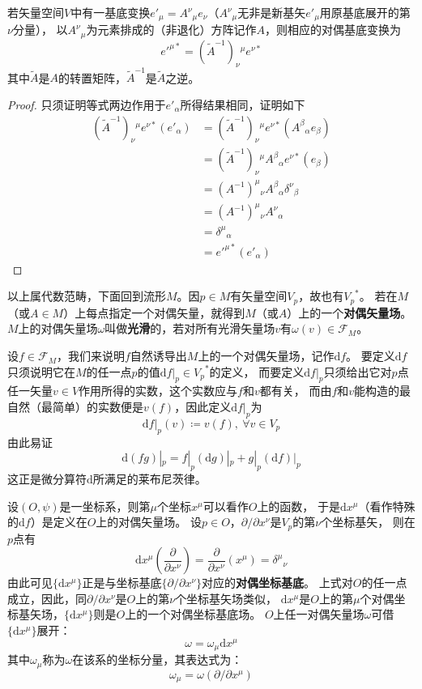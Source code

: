 \begin{theorem}
若矢量空间$V$中有一基底变换$e'_\mu = A^\nu{}_\mu e_\nu$（$A^\nu{}_\mu$无非是新基矢$e'_\mu$用原基底展开的第$\nu$分量），
以$A^\nu{}_\mu$为元素排成的（非退化）方阵记作$A$，则相应的对偶基底变换为
$$e'^{\mu*} = (\tilde{A}^{-1})_\nu{}^\mu e^{\nu*}$$
其中$\tilde{A}$是$A$的转置矩阵，$\tilde{A}^{-1}$是$\tilde{A}$之逆。
\end{theorem}

\begin{proof}
只须证明等式两边作用于$e'_\alpha$所得结果相同，证明如下
$$\begin{aligned}
(\tilde{A}^{-1})_\nu{}^\mu e^{\nu*}(e'_\alpha) & = (\tilde{A}^{-1})_\nu{}^\mu e^{\nu*}(A^\beta{}_\alpha e_\beta) \\
& = (\tilde{A}^{-1})_\nu{}^\mu A^\beta{}_\alpha e^{\nu*}(e_\beta) \\
& = (A^{-1})^\mu{}_\nu A^\beta{}_\alpha \delta^{\nu}{}_\beta \\
& = (A^{-1})^\mu{}_\nu A^\nu{}_\alpha \\
& = \delta^\mu{}_\alpha \\
& = e'^{\mu*}(e'_\alpha)
\end{aligned}$$
\end{proof}

以上属代数范畴，下面回到流形$M$。因$p \in M$有矢量空间$V_p$，故也有${V_p}^*$。
若在$M$（或$A \in M$）上每点指定一个对偶矢量，就得到$M$（或$A$）上的一个\textbf{对偶矢量场}。
$M$上的对偶矢量场$\omega$叫做\textbf{光滑}的，若对所有光滑矢量场$v$有$\omega(v) \in \mathscr{F}_M$。

设$f \in \mathscr{F}_M$，我们来说明$f$自然诱导出$M$上的一个对偶矢量场，记作$\mathrm{d}f$。
要定义$\mathrm{d}f$只须说明它在$M$的任一点$p$的值$\mathrm{d}f|_p \in {V_p}^*$的定义，
而要定义$\mathrm{d}f|_p$只须给出它对$p$点任一矢量$v \in V$作用所得的实数，这个实数应与$f$和$v$都有关，
而由$f$和$v$能构造的最自然（最简单）的实数便是$v(f)$，因此定义$\mathrm{d}f|_p$为
$$\mathrm{d}f|_p(v) \coloneq v(f), ~ \forall v \in V_p$$
由此易证
$$\mathrm{d}(fg)|_p = f|_p(\mathrm{d}g)|_p + g|_p(\mathrm{d}f)|_p$$
这正是微分算符$\mathrm{d}$所满足的莱布尼茨律。

设$(O, \psi)$是一坐标系，则第$\mu$个坐标$x^\mu$可以看作$O$上的函数，
于是$\mathrm{d}x^\mu$（看作特殊的$\mathrm{d}f$）是定义在$O$上的对偶矢量场。
设$p \in O$，$\partial / \partial x^\nu$是$V_p$的第$\nu$个坐标基矢，
则在$p$点有$$\mathrm{d}x^\mu\left(\frac{\partial}{\partial x^\nu}\right) = \frac{\partial}{\partial x^\nu}(x^\mu) = \delta^\mu{}_\nu$$
由此可见$\{\mathrm{d}x^\mu\}$正是与坐标基底$\{\partial / \partial x^\nu\}$对应的\textbf{对偶坐标基底}。
上式对$O$的任一点成立，因此，同$\partial / \partial x^\nu$是$O$上的第$\nu$个坐标基矢场类似，
$\mathrm{d}x^\mu$是$O$上的第$\mu$个对偶坐标基矢场，$\{\mathrm{d}x^\mu\}$则是$O$上的一个对偶坐标基底场。
$O$上任一对偶矢量场$\omega$可借$\{\mathrm{d}x^\mu\}$展开：$$\omega = \omega_\mu\mathrm{d}x^\mu$$
其中$\omega_\mu$称为$\omega$在该系的坐标分量，其表达式为：$$\omega_\mu = \omega(\partial / \partial x^\mu)$$

